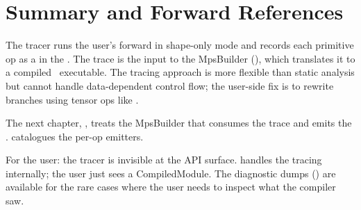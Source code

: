 \section{Summary and Forward References}
\label{sec:tracer:summary}

The tracer runs the user's forward in shape-only mode and
records each primitive op as a  in the
. The trace is the input to the MpsBuilder
(), which translates it to a compiled
\MPSGraph\ executable. The tracing approach is more flexible
than static analysis but cannot handle data-dependent control
flow; the user-side fix is to rewrite branches using tensor ops
like .

The next chapter, , treats the MpsBuilder
that consumes the trace and emits the \MPSGraph.
 catalogues the per-op emitters.

\begin{lucidnote}
For the user: the tracer is invisible at the API surface.
 handles the tracing internally; the user just
sees a CompiledModule. The diagnostic dumps ()
are available for the rare cases where the user needs to inspect
what the compiler saw.
\end{lucidnote}
